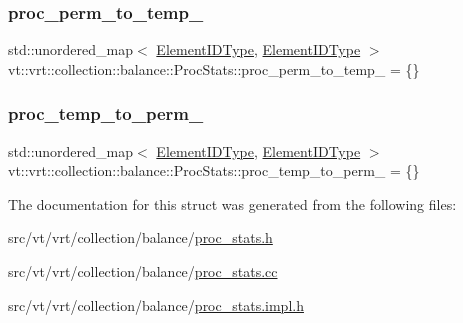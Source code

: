 \subsubsection{\texorpdfstring{proc\+\_\+perm\+\_\+to\+\_\+temp\+\_\+}{proc\_perm\_to\_temp\_}}
{\footnotesize\ttfamily std\+::unordered\+\_\+map$<$ \hyperlink{namespacevt_1_1vrt_1_1collection_1_1balance_a14c8d2c972f2913aa3f1636e5be0a120}{Element\+I\+D\+Type}, \hyperlink{namespacevt_1_1vrt_1_1collection_1_1balance_a14c8d2c972f2913aa3f1636e5be0a120}{Element\+I\+D\+Type} $>$ vt\+::vrt\+::collection\+::balance\+::\+Proc\+Stats\+::proc\+\_\+perm\+\_\+to\+\_\+temp\+\_\+ = \{\}\hspace{0.3cm}{\ttfamily [static]}}

\mbox{\label{structvt_1_1vrt_1_1collection_1_1balance_1_1_proc_stats_a9bf0a8d34c3062ba54309ea916eca8c5}} 
\subsubsection{\texorpdfstring{proc\+\_\+temp\+\_\+to\+\_\+perm\+\_\+}{proc\_temp\_to\_perm\_}}
{\footnotesize\ttfamily std\+::unordered\+\_\+map$<$ \hyperlink{namespacevt_1_1vrt_1_1collection_1_1balance_a14c8d2c972f2913aa3f1636e5be0a120}{Element\+I\+D\+Type}, \hyperlink{namespacevt_1_1vrt_1_1collection_1_1balance_a14c8d2c972f2913aa3f1636e5be0a120}{Element\+I\+D\+Type} $>$ vt\+::vrt\+::collection\+::balance\+::\+Proc\+Stats\+::proc\+\_\+temp\+\_\+to\+\_\+perm\+\_\+ = \{\}\hspace{0.3cm}{\ttfamily [static]}}



The documentation for this struct was generated from the following files\+:\begin{DoxyCompactItemize}
\item 
src/vt/vrt/collection/balance/\hyperlink{proc__stats_8h}{proc\+\_\+stats.\+h}\item 
src/vt/vrt/collection/balance/\hyperlink{proc__stats_8cc}{proc\+\_\+stats.\+cc}\item 
src/vt/vrt/collection/balance/\hyperlink{proc__stats_8impl_8h}{proc\+\_\+stats.\+impl.\+h}\end{DoxyCompactItemize}
